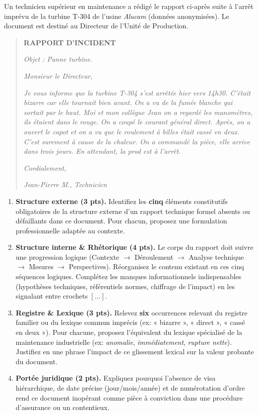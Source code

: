 \documentclass[11pt]{article}
\begin{document}
\begin{exercice}
\label{exo:analyse}
Un technicien supérieur en maintenance a rédigé le rapport ci-après suite à l'arrêt imprévu de la turbine T-304 de l'usine \textit{Alucam} (données anonymisées). Le document est destiné au Directeur de l'Unité de Production.

\begin{quote}
\textbf{RAPPORT D'INCIDENT}

\textit{Objet : Panne turbine.}

\textit{Monsieur le Directeur,}

\textit{Je vous informe que la turbine T-304 s'est arrêtée hier vers 14h30. C'était bizarre car elle tournait bien avant. On a vu de la fumée blanche qui sortait par le haut. Moi et mon collègue Jean on a regardé les manomètres, ils étaient dans le rouge. On a coupé le courant général direct. Après, on a ouvert le capot et on a vu que le roulement à billes était cassé en deux. C'est surement à cause de la chaleur. On a commandé la pièce, elle arrive dans trois jours. En attendant, la prod est à l'arrêt.}

\textit{Cordialement,}

\textit{Jean-Pierre M., Technicien}
\end{quote}

\begin{enumerate}
    \item \textbf{Structure externe (3 pts).} Identifiez les \textbf{cinq} éléments constitutifs obligatoires de la structure externe d'un rapport technique formel absents ou défaillants dans ce document. Pour chacun, proposez une formulation professionnelle adaptée au contexte.
    \item \textbf{Structure interne \& Rhétorique (4 pts).} Le corps du rapport doit suivre une progression logique (Contexte $\rightarrow$ Déroulement $\rightarrow$ Analyse technique $\rightarrow$ Mesures $\rightarrow$ Perspectives). Réorganisez le contenu existant en ces cinq séquences logiques. Complétez les manques informationnels indispensables (hypothèses techniques, référentiels normes, chiffrage de l'impact) en les signalant entre crochets $[\dots]$.
    \item \textbf{Registre \& Lexique (3 pts).} Relevez \textbf{six} occurrences relevant du registre familier ou du lexique commun imprécis (ex: « bizarre », « direct », « cassé en deux »). Pour chacune, proposez l'équivalent du lexique spécialisé de la maintenance industrielle (ex: \textit{anomalie}, \textit{immédiatement}, \textit{rupture nette}). Justifiez en une phrase l'impact de ce glissement lexical sur la valeur probante du document.
    \item \textbf{Portée juridique (2 pts).} Expliquez pourquoi l'absence de visa hiérarchique, de date précise (jour/mois/année) et de numérotation d'ordre rend ce document inopérant comme pièce à conviction dans une procédure d'assurance ou un contentieux.
\end{enumerate}
\end{exercice}
\end{document}
